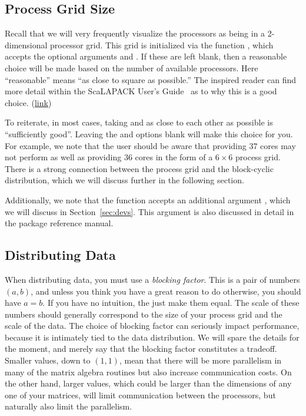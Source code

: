 \subsection[]{Process Grid Size}

Recall that we will very frequently visualize the processors as being in a 2-dimensional processor grid.  This grid is initialized via the function , which accepts the optional arguments  and .  If these are left blank, then a reasonable choice will be made based on the number of available processors.  Here ``reasonable'' means ``as close to square as possible.''  The inspired reader can find more detail within the ScaLAPACK User's Guide~\citep{slug} as to why this is a good choice. (\href{http://www.netlib.org/utk/papers/scalapack/node20.html}{link})

To reiterate, in most cases, taking  and  as close to each other as possible is ``sufficiently good''.  Leaving the  and  options blank will make this choice for you.  For example, we note that the user should be aware that providing 37 cores may not perform as well as providing 36 cores in the form of a $6\times6$ process grid.  There is a strong connection between the process grid and the block-cyclic distribution, which we will discuss further in the following section.

Additionally, we note that the  function accepts an additional argument , which we will discuss in Section~\ref{sec:devs}.  This argument is also discussed in detail in the package reference manual.

\subsection[]{Distributing Data}

When distributing data, you must use a \emph{blocking factor}.  This is a pair of numbers $(a,b)$, and unless you think you have a great reason to do otherwise, you should have $a=b$.  If you have no intuition, the just make them equal.  The scale of these numbers should generally correspond to the size of your process grid and the scale of the data.  The choice of blocking factor can seriously impact performance, because it is intimately tied to the data distribution.  We will spare the details for the moment, and merely say that the blocking factor constitutes a tradeoff.  Smaller values, down to $(1,1)$, mean that there will be more parallelism in many of the matrix algebra routines but also increase communication costs.  On the other hand, larger values, which could be larger than the dimensions of any one of your matrices, will limit communication between the processors, but naturally also limit the parallelism.

